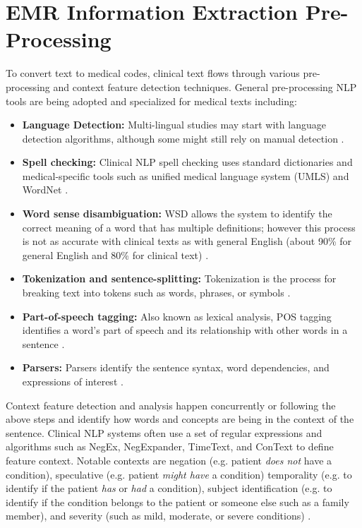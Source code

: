 \documentclass[sigconf]{acmart}
\begin{document}
\section{EMR Information Extraction Pre-Processing}
To convert text to medical codes, clinical text flows through various pre-processing and context feature detection techniques. General pre-processing NLP tools are being adopted and specialized for medical texts including:
\begin{itemize}
\item \textbf{Language Detection:} Multi-lingual studies may start with language detection algorithms, although some might still rely on manual detection \cite{diomaiuta2017novel}.
\item \textbf{Spell checking:} Clinical NLP spell checking uses standard dictionaries and medical-specific tools such as unified medical language system (UMLS) and WordNet \cite{meystre2008extracting}.
\item \textbf{Word sense disambiguation:} WSD allows the system to identify the correct meaning of a word that has multiple definitions; however this process is not as accurate with clinical texts as with general English (about 90\% for general English and 80\% for clinical text) \cite{meystre2008extracting}.
\item \textbf{Tokenization and sentence-splitting:}  Tokenization is the process for breaking text into tokens such as words, phrases, or symbols \cite{diomaiuta2017novel} \cite{tomanek2007sentence}.
\item \textbf{Part-of-speech tagging:} Also known as lexical analysis, POS tagging identifies a word's part of speech and its relationship with other words in a sentence \cite{diomaiuta2017novel} \cite{meystre2008extracting}.
\item \textbf{Parsers:} Parsers identify the sentence syntax, word dependencies, and expressions of interest \cite{diomaiuta2017novel} \cite{meystre2008extracting}.
\end{itemize}

Context feature detection and analysis happen concurrently or following the above steps and identify how words and concepts are being in the context of the sentence. Clinical NLP systems often use a set of regular expressions and algorithms such as NegEx, NegExpander, TimeText, and ConText to define feature context. Notable contexts are negation (e.g. patient \textit{does not} have a condition), speculative (e.g. patient \textit{might have} a condition) temporality (e.g. to identify if the patient \textit{has} or \textit{had} a condition), subject identification (e.g. to identify if the condition belongs to the patient or someone else such as a family member), and severity (such as mild, moderate, or severe conditions) \cite{meystre2008extracting}\cite{velupillai2015recent}.
\end{document}
